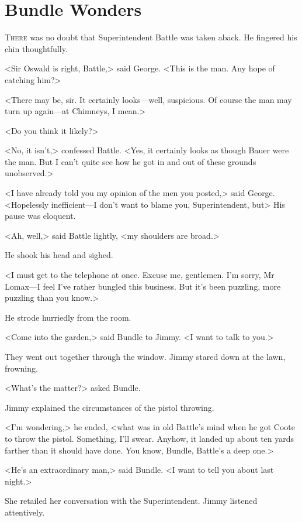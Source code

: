 \chapter{Bundle Wonders}

\lettrine{T}{here} was no doubt that Superintendent Battle was taken aback. He fingered his chin thoughtfully.

\zz
<Sir Oswald is right, Battle,> said George. <This is the man. Any hope of catching him?>

<There may be, sir. It certainly looks—well, suspicious. Of course the man may turn up again—at Chimneys, I mean.>

<Do you think it likely?>

<No, it isn't,> confessed Battle. <Yes, it certainly looks as though Bauer were the man. But I can't quite see how he got in and out of these grounds unobserved.>

<I have already told you my opinion of the men you posted,> said George. <Hopelessly inefficient—I don't want to blame you, Superintendent, but\longdash> His pause was eloquent.

<Ah, well,> said Battle lightly, <my shoulders are broad.>

He shook his head and sighed.

<I must get to the telephone at once. Excuse me, gentlemen. I'm sorry, Mr Lomax—I feel I've rather bungled this business. But it's been puzzling, more puzzling than you know.>

He strode hurriedly from the room.

<Come into the garden,> said Bundle to Jimmy. <I want to talk to you.>

They went out together through the window. Jimmy stared down at the lawn, frowning.

<What's the matter?> asked Bundle.

Jimmy explained the circumstances of the pistol throwing.

<I'm wondering,> he ended, <what was in old Battle's mind when he got Coote to throw the pistol. Something, I'll swear. Anyhow, it landed up about ten yards farther than it should have done. You know, Bundle, Battle's a deep one.>

<He's an extraordinary man,> said Bundle. <I want to tell you about last night.>

She retailed her conversation with the Superintendent. Jimmy listened attentively.

